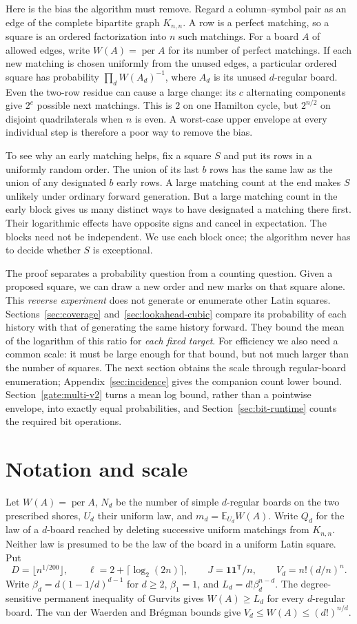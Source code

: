 \documentclass[11pt]{article}
\theoremstyle{definition}\newtheorem{definition}[theorem]{Definition}
\DeclareMathOperator{\per}{per}
\newcommand{\E}{\mathbb E}
\newcommand{\one}{\mathbf 1}
\begin{document}
Here is the bias the algorithm must remove. Regard a column--symbol pair as an edge of the complete bipartite graph $K_{n,n}$. A row is a perfect matching, so a square is an ordered factorization into $n$ such matchings. For a board $A$ of allowed edges, write $W(A)=\per A$ for its number of perfect matchings. If each new matching is chosen uniformly from the unused edges, a particular ordered square has probability $\prod_dW(A_d)^{-1}$, where $A_d$ is its unused $d$-regular board. Even the two-row residue can cause a large change: its $c$ alternating components give $2^c$ possible next matchings. This is $2$ on one Hamilton cycle, but $2^{n/2}$ on disjoint quadrilaterals when $n$ is even. A worst-case upper envelope at every individual step is therefore a poor way to remove the bias.

To see why an early matching helps, fix a square $S$ and put its rows in a uniformly random order. The union of its last $b$ rows has the same law as the union of any designated $b$ early rows. A large matching count at the end makes $S$ unlikely under ordinary forward generation. But a large matching count in the early block gives us many distinct ways to have designated a matching there first. Their logarithmic effects have opposite signs and cancel in expectation. The blocks need not be independent. We use each block once; the algorithm never has to decide whether $S$ is exceptional.

The proof separates a probability question from a counting question. Given a proposed square, we can draw a new order and new marks on that square alone. This \emph{reverse experiment} does not generate or enumerate other Latin squares. Sections~\ref{sec:coverage} and~\ref{sec:lookahead-cubic} compare its probability of each history with that of generating the same history forward. They bound the mean of the logarithm of this ratio for \emph{each fixed target}. For efficiency we also need a common scale: it must be large enough for that bound, but not much larger than the number of squares. The next section obtains the scale through regular-board enumeration; Appendix~\ref{sec:incidence} gives the companion count lower bound. Section~\ref{gate:multi-v2} turns a mean log bound, rather than a pointwise envelope, into exactly equal probabilities, and Section~\ref{sec:bit-runtime} counts the required bit operations.
\section{Notation and scale}
Let $W(A)=\per A$, $N_d$ be the number of simple $d$-regular boards on the two prescribed shores, $U_d$ their uniform law, and $m_d=\E_{U_d}W(A)$. Write $Q_d$ for the law of a $d$-board reached by deleting successive uniform matchings from $K_{n,n}$. Neither law is presumed to be the law of the board in a uniform Latin square. Put
\[
 D=\lfloor n^{1/200}\rfloor,\qquad \ell=2+\lceil\log_2(2n)\rceil,
 \qquad J=\one\one^\mathsf{T}/n,\qquad V_d=n!(d/n)^n.
\]
Write $\beta_d=d(1-1/d)^{d-1}$ for $d\ge2$, $\beta_1=1$,
and $L_d=d!\beta_d^{n-d}$. The degree-sensitive permanent inequality of Gurvits \cite{Gurvits,LS} gives $W(A)\ge L_d$ for every $d$-regular board. The van der Waerden and Br\'egman bounds give $V_d\le W(A)\le(d!)^{n/d}$.
\end{document}
